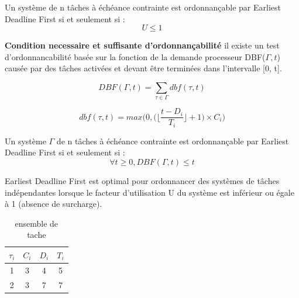 \begin{theoreme}[\cite{LL73}]
 Un système de n tâches à échéance contrainte est ordonnançable par Earliest Deadline First si et seulement si :
 \begin{equation}
 U \leq 1
 \end{equation}
\end{theoreme}


\textbf{Condition necessaire et suffisante d'ordonnançabilité}\cite{BHR93} il existe un test d’ordonnancabilité basée sur la fonction
de la demande processeur DBF($\Gamma,t$) causée par des tâches activées et devant être terminées dans l’intervalle [0, t].

\begin{equation}
DBF(\Gamma,t) = \sum_{\tau \in \Gamma}dbf(\tau,t)
\end{equation}

\begin{equation}
dbf(\tau,t) = max \bigg( 0,\bigg( \bigg\lfloor \frac{t - D_i}{T_i} \bigg\rfloor + 1 \bigg) \times C_i \bigg)
\end{equation}

\begin{theoreme}
Un système $\Gamma$ de n tâches à échéance contrainte est ordonnançable par Earliest Deadline First si et seulement si :
\begin{equation}
\forall t \geq 0 , DBF(\Gamma,t) \leq t 
\end{equation}
\end{theoreme}

\begin{theoreme}
Earliest Deadline First est optimal pour ordonnancer des systèmes de tâches indépendantes lorsque le facteur d'utilisation U du système est inférieur ou égale à 1 (absence de surcharge).
\end{theoreme}

\begin{table}[h]
\begin{center}
\begin{tabular}{|c|c|c|c|}
 \hline$\tau_i$ & $C_i$ & $D_i$ & $T_i$\\ 
 \hline1 & 3 & 4 & 5\\ 
 \hline2 & 3 & 7 & 7 \\  
 \hline
 \end{tabular}
\end{center}
\caption{ensemble de tache } \label{tab:exempleEDF}
\end{table}
\vspace{1cm}

